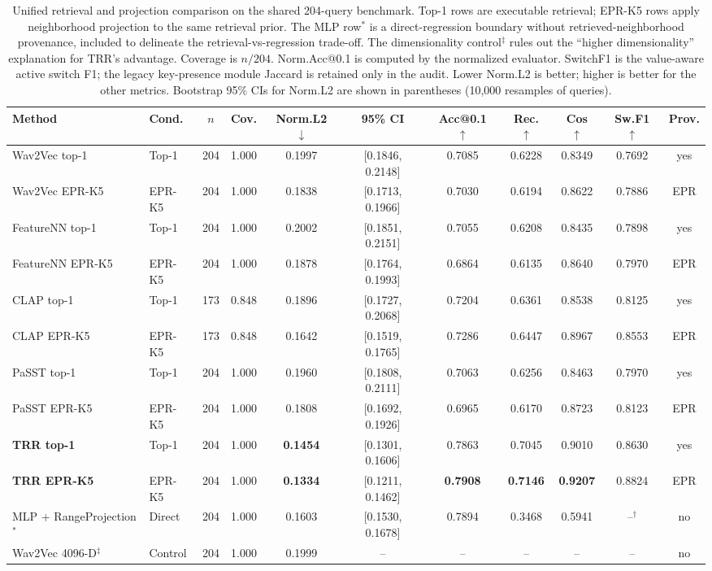 \begin{table}[t]
\centering
\caption{Unified retrieval and projection comparison on the shared 204-query benchmark. Top-1 rows are executable retrieval; EPR-K5 rows apply neighborhood projection to the same retrieval prior. The MLP row$^*$ is a direct-regression boundary without retrieved-neighborhood provenance, included to delineate the retrieval-vs-regression trade-off. The dimensionality control$^\ddagger$ rules out the ``higher dimensionality'' explanation for TRR's advantage. Coverage is $n/204$. Norm.Acc@0.1 is computed by the normalized evaluator. SwitchF1 is the value-aware active switch F1; the legacy key-presence module Jaccard is retained only in the audit. Lower Norm.L2 is better; higher is better for the other metrics. Bootstrap 95\% CIs for Norm.L2 are shown in parentheses (10,000 resamples of queries).}
\label{tab:main_results}
\footnotesize
\setlength{\tabcolsep}{2.5pt}
\begin{tabular}{llccccccccc}
\toprule
\textbf{Method} & \textbf{Cond.} & \textbf{$n$} & \textbf{Cov.} & \textbf{Norm.L2} $\downarrow$ & \textbf{95\% CI} & \textbf{Acc@0.1} $\uparrow$ & \textbf{Rec.} $\uparrow$ & \textbf{Cos} $\uparrow$ & \textbf{Sw.F1} $\uparrow$ & \textbf{Prov.} \\
\midrule
Wav2Vec top-1 & Top-1 & 204 & 1.000 & 0.1997 & [0.1846, 0.2148] & 0.7085 & 0.6228 & 0.8349 & 0.7692 & yes \\
Wav2Vec EPR-K5 & EPR-K5 & 204 & 1.000 & 0.1838 & [0.1713, 0.1966] & 0.7030 & 0.6194 & 0.8622 & 0.7886 & EPR \\
FeatureNN top-1 & Top-1 & 204 & 1.000 & 0.2002 & [0.1851, 0.2151] & 0.7055 & 0.6208 & 0.8435 & 0.7898 & yes \\
FeatureNN EPR-K5 & EPR-K5 & 204 & 1.000 & 0.1878 & [0.1764, 0.1993] & 0.6864 & 0.6135 & 0.8640 & 0.7970 & EPR \\
CLAP top-1 & Top-1 & 173 & 0.848 & 0.1896 & [0.1727, 0.2068] & 0.7204 & 0.6361 & 0.8538 & 0.8125 & yes \\
CLAP EPR-K5 & EPR-K5 & 173 & 0.848 & 0.1642 & [0.1519, 0.1765] & 0.7286 & 0.6447 & 0.8967 & 0.8553 & EPR \\
PaSST top-1 & Top-1 & 204 & 1.000 & 0.1960 & [0.1808, 0.2111] & 0.7063 & 0.6256 & 0.8463 & 0.7970 & yes \\
PaSST EPR-K5 & EPR-K5 & 204 & 1.000 & 0.1808 & [0.1692, 0.1926] & 0.6965 & 0.6170 & 0.8723 & 0.8123 & EPR \\
\textbf{TRR top-1} & Top-1 & 204 & 1.000 & \textbf{0.1454} & [0.1301, 0.1606] & 0.7863 & 0.7045 & 0.9010 & 0.8630 & yes \\
\textbf{TRR EPR-K5} & EPR-K5 & 204 & 1.000 & \textbf{0.1334} & [0.1211, 0.1462] & \textbf{0.7908} & \textbf{0.7146} & \textbf{0.9207} & 0.8824 & EPR \\
MLP + RangeProjection$^*$ & Direct & 204 & 1.000 & 0.1603 & [0.1530, 0.1678] & 0.7894 & 0.3468 & 0.5941 & --$^{\dagger}$ & no \\
Wav2Vec 4096-D$^\ddagger$ & Control & 204 & 1.000 & 0.1999 & -- & -- & -- & -- & -- & no \\
\bottomrule
\end{tabular}
\end{table}

